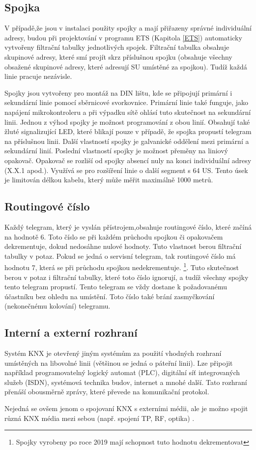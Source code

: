 \subsection{Spojka}
V případě,že jsou v instalaci použity spojky a mají přiřazeny správné individuální adresy, budou při projektování v programu ETS (Kapitola \ref{ETS}) automaticky vytvořeny filtrační tabulky jednotlivých spojek. Filtrační tabulka obsahuje skupinové adresy, které smí projít skrz příslušnou spojku (obsahuje všechny obsažené skupinové adresy, které adresují SU umístěné za spojkou). Tudíž každá linie pracuje nezávisle.

Spojky jsou vytvořeny pro montáž na DIN lištu, kde se připojují primární i sekundární linie pomocí sběrnicové svorkovnice. Primární linie také funguje, jako napájení mikrokontroleru a při výpadku sítě ohlásí tuto skutečnost na sekundární linii. Jednou z výhod spojky je možnost programování z obou linií. Obsahují také žluté signalizující LED, které blikají pouze v případě, že spojka propustí telegram na příslušnou linii. Další vlastností spojky je galvanické oddělení mezi primární a sekundární linií. Poslední vlastností spojky je možnost přeměny na liniový opakovač. Opakovač se rozliší od spojky absencí nuly na konci individuální adresy (X.X.1 apod.). Využívá se pro rozšíření linie o další segment s 64 US. Tento úsek je limitován délkou kabelu, který může měřit maximálně 1000 metrů. \cite{Topologie}

\subsection{Routingové číslo}
Každý telegram, který je vyslán přístrojem,obsahuje routingové číslo, které začíná na hodnotě 6. Toto číslo se při každém průchodu spojkou či opakovačem dekrementuje, dokud nedosáhne nulové hodnoty. Tuto vlastnost berou filtrační tabulky v potaz.
Pokud se jedná o servisní telegram, tak routingové číslo má hodnotu 7, která se při průchodu spojkou nedekrementuje. \footnote{Spojky vyrobeny po roce 2019 mají schopnost tuto hodnotu dekrementovat}. Tuto skutečnost berou v potaz i filtrační tabulky, které toto číslo ignorují, a tudíž všechny spojky tento telegram propustí. Tento telegram se vždy dostane k požadovanému účastníku bez ohledu na umístění.
Toto číslo také brání zasmyčkování (nekonečnému kolování) telegramu. \cite{Topologie}
\subsection{Interní a externí rozhraní}
Systém KNX je otevřený jiným systémům za použití vhodných rozhraní umístěných na libovolné linii (většinou se jedná o páteřní linii). Lze připojit například programovatelný logický automat (PLC), digitální síť integrovaných služeb (ISDN), systémová technika budov, internet a mnohé další.
Tato rozhraní přenáší obousměrně zprávy, které převede na komunikační protokol.

Nejedná se ovšem jenom o spojovaní KNX s externími médii, ale je možno spojit různá KNX média mezi sebou (např. spojení TP, RF, optika) \cite{Topologie}.